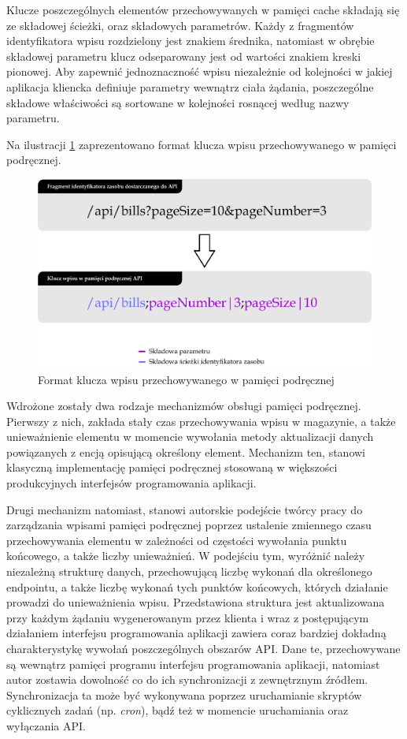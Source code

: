 Klucze poszczególnych elementów przechowywanych w pamięci cache składają się ze składowej ścieżki, oraz składowych parametrów. Każdy z fragmentów identyfikatora wpisu rozdzielony jest znakiem średnika, natomiast w obrębie składowej parametru klucz odseparowany jest od wartości znakiem kreski pionowej. Aby zapewnić jednoznaczność wpisu niezależnie od kolejności w jakiej aplikacja kliencka definiuje parametry wewnątrz ciała żądania, poszczególne składowe właściwości są sortowane w kolejności rosnącej według nazwy parametru.

Na ilustracji \ref{fig:cache-klucz} zaprezentowano format klucza wpisu przechowywanego w pamięci podręcznej.

\begin{figure}[ht]
    \centering
     \includegraphics[width=\linewidth]{rys04/cache-klucz.png}
    \caption{Format klucza wpisu przechowywanego w pamięci podręcznej}
    \label{fig:cache-klucz}
\end{figure}

Wdrożone zostały dwa rodzaje mechanizmów obsługi pamięci podręcznej. Pierwszy z nich, zakłada stały czas przechowywania wpisu w magazynie, a także unieważnienie elementu w momencie wywołania metody aktualizacji danych powiązanych z encją opisującą określony element. Mechanizm ten, stanowi klasyczną implementację pamięci podręcznej stosowaną w większości produkcyjnych interfejsów programowania aplikacji.

Drugi mechanizm natomiast, stanowi autorskie podejście twórcy pracy do zarządzania wpisami pamięci podręcznej poprzez ustalenie zmiennego czasu przechowywania elementu w zależności od częstości wywołania punktu końcowego, a także liczby unieważnień. W podejściu tym, wyróżnić należy niezależną strukturę danych, przechowującą liczbę wykonań dla określonego endpointu, a także liczbę wykonań tych punktów końcowych, których działanie prowadzi do unieważnienia wpisu. Przedstawiona struktura jest aktualizowana przy każdym żądaniu wygenerowanym przez klienta i wraz z postępującym działaniem interfejsu programowania aplikacji zawiera coraz bardziej dokładną charakterystykę wywołań poszczególnych obszarów API. Dane te, przechowywane są wewnątrz pamięci programu interfejsu programowania aplikacji, natomiast autor zostawia dowolność co do ich synchronizacji z zewnętrznym źródłem. Synchronizacja ta może być wykonywana poprzez uruchamianie skryptów cyklicznych zadań (np. \textit{cron}), bądź też w momencie uruchamiania oraz wyłączania API.

